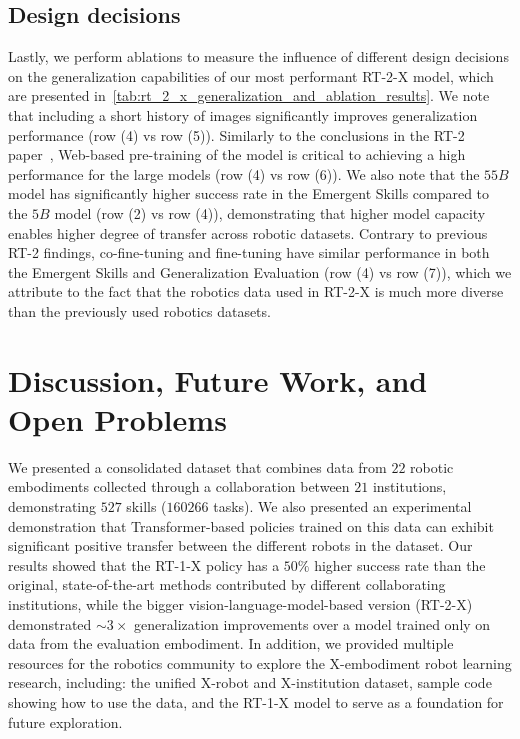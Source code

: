 \documentclass[letterpaper, 10 pt, conference]{ieeeconf}  %
\newcommand{\numembodiment}{22}
\newcommand{\numinstitution}{21}
\newcommand{\numskill}{527}
\newcommand{\numtask}{160266}
\newcommand{\cro}{X}
\begin{document}
\vspace{-0.4em}
\subsection{Design decisions} 
\vspace{-0.25em}

Lastly, we perform ablations to measure the influence of different design decisions on the generalization capabilities of our most performant RT-2-X model, which are presented in~\cref{tab:rt_2_x_generalization_and_ablation_results}.
We note that including a short history of images significantly improves generalization performance (row (4) vs row (5)). 
Similarly to the conclusions in the RT-2 paper~\cite{brohan2023rt2}, Web-based pre-training of the model is critical to achieving a high performance for the large models (row (4) vs row (6)).
We also note that the $55B$ model has significantly higher success rate in the Emergent Skills compared to the $5B$ model (row (2) vs row (4)), demonstrating that higher model capacity enables higher degree of transfer across robotic datasets. Contrary to previous RT-2 findings, co-fine-tuning and fine-tuning have similar performance in both the Emergent Skills and Generalization Evaluation (row (4) vs row (7)), which we attribute to the fact that the robotics data used in RT-2-X is much more diverse than the previously used robotics datasets. 








\vspace{-0.3em}
\section{Discussion, Future Work, and Open Problems}
\vspace{-0.3em}
\label{sec:conclusions}

We presented a consolidated dataset that combines data from $\numembodiment$ robotic embodiments collected through a collaboration between $\numinstitution$ institutions, demonstrating $\numskill$ skills ($\numtask$ tasks). We also presented an experimental demonstration that Transformer-based policies trained on this data can exhibit significant positive transfer between the different robots in the dataset. Our results showed that the RT-1-X policy has a $50\%$ higher success rate than the original, state-of-the-art methods contributed by different collaborating institutions, while the bigger vision-language-model-based version (RT-2-X) demonstrated $\sim3\times$ generalization improvements over a model trained only on data from the evaluation embodiment. In addition, we provided multiple resources for the robotics community to explore the \cro-embodiment robot learning research, including: the unified \cro-robot and \cro-institution dataset, sample code showing how to use the data, and the RT-1-X model to serve as a foundation for future exploration. 
\end{document}
